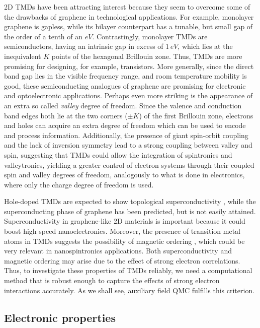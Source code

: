 \ac{2D} \acp{TMD} have been attracting interest because they seem to overcome some of the drawbacks of graphene in technological applications.
For example, monolayer graphene is gapless, while its bilayer counterpart has a tunable, but small gap of the order of a tenth of an $eV$.
Contrastingly, monolayer \acp{TMD} are semiconductors, having an intrinsic gap in excess of $1 \, eV$, which lies at the inequivalent $K$ points of the hexagonal Brillouin zone.
Thus, \acp{TMD} are more promising for designing, for example, transistors.
More generally, since the direct band gap lies in the visible frequency range, and room temperature mobility is good, these semiconducting analogues of graphene are promising for electronic and optoelectronic applications.
Perhaps even more striking is the appearance of an extra so called \emph{valley} degree of freedom.
Since the valence and conduction band edges both lie at the two corners ($\pm K$) of the first Brillouin zone, electrons and holes can acquire an extra degree of freedom which can be used to encode and process information.
Additionally, the presence of giant spin-orbit coupling and the lack of inversion symmetry lead to a strong coupling between valley and spin, suggesting that \acp{TMD} could allow the integration of spintronics and valleytronics, yielding a greater control of electron systems through their coupled spin and valley degrees of freedom, analogously to what is done in electronics, where only the charge degree of freedom is used.
 
Hole-doped \acp{TMD} are expected to show topological superconductivity \cite{hsu_topological_2017}, while the superconducting phase of graphene has been predicted, but is not easily attained.
Superconductivity in graphene-like \ac{2D} materials is important because it could boost high speed nanoelectronics.
Moreover, the presence of transition metal atoms in \acp{TMD} suggests the possibility of magnetic ordering \cite{braz_valley_2017}, which could be very relevant in nanospintronics applications.
Both superconductivity and magnetic ordering may arise due to the effect of strong electron correlations.
Thus, to investigate these properties of \acp{TMD} reliably, we need a computational method that is robust enough to capture the effects of strong electron interactions accurately.
As we shall see, auxiliary field \ac{QMC}  fulfills this criterion.

\subsection{Electronic properties}\label{subsec:electronic}

